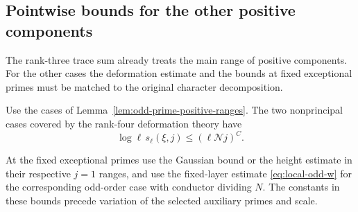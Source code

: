 

\subsection{Pointwise bounds for the other positive components}
\label{subsec:odd-prime-pointwise}

The rank-three trace sum already treats the main range of positive components. For the other cases the deformation estimate and the bounds at fixed exceptional primes must be matched to the original character decomposition.

\begin{proposition}\label{prop:other-positive-cohomology}
Use the cases of Lemma~\ref{lem:odd-prime-positive-ranges}.
The two nonprincipal cases covered by the rank-four deformation
theory have 
\[
 \log\ell\,s_\ell(\xi,j)\le(\ell\mathcal Nj)^C.
\]

At the fixed exceptional primes use the Gaussian bound or the
height estimate in their respective \(j=1\) ranges, and use the
fixed-layer estimate \textup{\eqref{eq:local-odd-w}} for the corresponding odd-order
case with conductor dividing \(N\). The constants in these bounds
precede variation of the selected auxiliary primes and scale.
\end{proposition}

